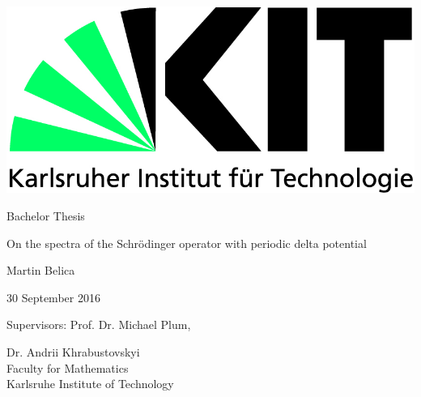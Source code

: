 \begin{titlepage}
  \includegraphics[scale=0.45]{kit-logo.jpg}
  \vspace*{2cm} 

  \begin{center} \large 
    
    Bachelor Thesis
    \vspace*{2cm}

    {\huge On the spectra of the Schrödinger operator with periodic delta potential}
    \vspace*{2.5cm}

    Martin Belica
    \vspace*{0.125cm}

    30 September 2016 %
    \vspace*{4.25cm}


    Supervisors: Prof. Dr. Michael Plum,
    \vspace*{0.125cm}
    
    Dr. Andrii Khrabustovskyi \\[1cm]
    Faculty for Mathematics \\[1cm]
	Karlsruhe Institute of Technology
  \end{center}
\end{titlepage}